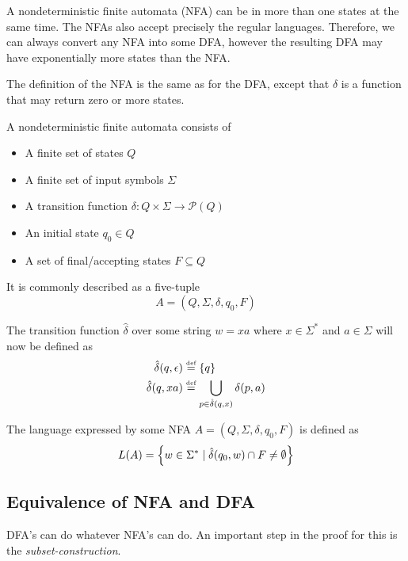 
A nondeterministic finite automata (NFA) can be in more than one states at the same time. The NFAs also accept precisely the regular languages. Therefore, we can always convert any NFA into some DFA, however the resulting DFA may have exponentially more states than the NFA.

The definition of the NFA is the same as for the DFA, except that $\delta$ is a function that may return zero or more states.

\begin{definition}[NFA] \label{def:nfa}
    A nondeterministic finite automata consists of 
    \begin{itemize}
        \item A finite set of states $Q$
        \item A finite set of input symbols $\Sigma$
        \item A transition function $\delta : Q\times \Sigma \rightarrow \mathcal{P}(Q)$
        \item An initial state $q_0 \in Q$
        \item A set of final/accepting states $F \subseteq Q$
    \end{itemize}
    It is commonly described as a five-tuple $$A = (Q, \Sigma, \delta, q_0, F)$$
\end{definition}

The transition function $\hat\delta$ over some string $w = xa$ where $x\in \Sigma^*$ and $a \in \Sigma$ will now be defined as 
\begin{align*}
    \hat\delta(q, \epsilon) &\stackrel {\mbox{\tiny def}}{=} \left\{ q \right\} \\
    \hat\delta(q, xa) &\stackrel {\mbox{\tiny def}}{=} \bigcup_{p\in \hat\delta(q,x)} \delta(p, a)
\end{align*}

The language expressed by some NFA $A = (Q, \Sigma, \delta, q_0, F)$ is defined as 
$$L(A) = \left\{ w \in \Sigma^* \mid \hat\delta(q_0, w) \cap F \neq \emptyset \right\}$$

\subsection{Equivalence of NFA and DFA}
DFA's can do whatever NFA's can do. An important step in the proof for this is the \textit{subset-construction}.

